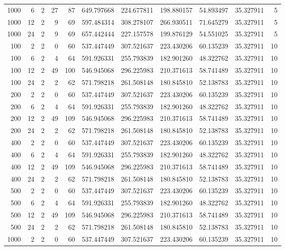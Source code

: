 \begin{table}
\begin{tabular}{rrrrrrrrrrr}
1000 & 6 & 2 & 27 & 87 & 649.797668 & 224.677811 & 198.880157 & 54.893497 & 35.327911 & 5 \\
1000 & 12 & 2 & 9 & 69 & 597.484314 & 308.278107 & 266.930511 & 71.645279 & 35.327911 & 5 \\
1000 & 24 & 2 & 9 & 69 & 657.442444 & 227.157578 & 199.876129 & 54.551025 & 35.327911 & 5 \\
100 & 2 & 2 & 0 & 60 & 537.447449 & 307.521637 & 223.430206 & 60.135239 & 35.327911 & 10 \\
100 & 6 & 2 & 4 & 64 & 591.926331 & 255.793839 & 182.901260 & 48.322762 & 35.327911 & 10 \\
100 & 12 & 2 & 49 & 100 & 546.945068 & 296.225983 & 210.371613 & 58.741489 & 35.327911 & 10 \\
100 & 24 & 2 & 2 & 62 & 571.798218 & 261.508148 & 180.845810 & 52.138783 & 35.327911 & 10 \\
200 & 2 & 2 & 0 & 60 & 537.447449 & 307.521637 & 223.430206 & 60.135239 & 35.327911 & 10 \\
200 & 6 & 2 & 4 & 64 & 591.926331 & 255.793839 & 182.901260 & 48.322762 & 35.327911 & 10 \\
200 & 12 & 2 & 49 & 109 & 546.945068 & 296.225983 & 210.371613 & 58.741489 & 35.327911 & 10 \\
200 & 24 & 2 & 2 & 62 & 571.798218 & 261.508148 & 180.845810 & 52.138783 & 35.327911 & 10 \\
400 & 2 & 2 & 0 & 60 & 537.447449 & 307.521637 & 223.430206 & 60.135239 & 35.327911 & 10 \\
400 & 6 & 2 & 4 & 64 & 591.926331 & 255.793839 & 182.901260 & 48.322762 & 35.327911 & 10 \\
400 & 12 & 2 & 49 & 109 & 546.945068 & 296.225983 & 210.371613 & 58.741489 & 35.327911 & 10 \\
400 & 24 & 2 & 2 & 62 & 571.798218 & 261.508148 & 180.845810 & 52.138783 & 35.327911 & 10 \\
500 & 2 & 2 & 0 & 60 & 537.447449 & 307.521637 & 223.430206 & 60.135239 & 35.327911 & 10 \\
500 & 6 & 2 & 4 & 64 & 591.926331 & 255.793839 & 182.901260 & 48.322762 & 35.327911 & 10 \\
500 & 12 & 2 & 49 & 109 & 546.945068 & 296.225983 & 210.371613 & 58.741489 & 35.327911 & 10 \\
500 & 24 & 2 & 2 & 62 & 571.798218 & 261.508148 & 180.845810 & 52.138783 & 35.327911 & 10 \\
1000 & 2 & 2 & 0 & 60 & 537.447449 & 307.521637 & 223.430206 & 60.135239 & 35.327911 & 10 \\

\end{tabular}
\end{table}

